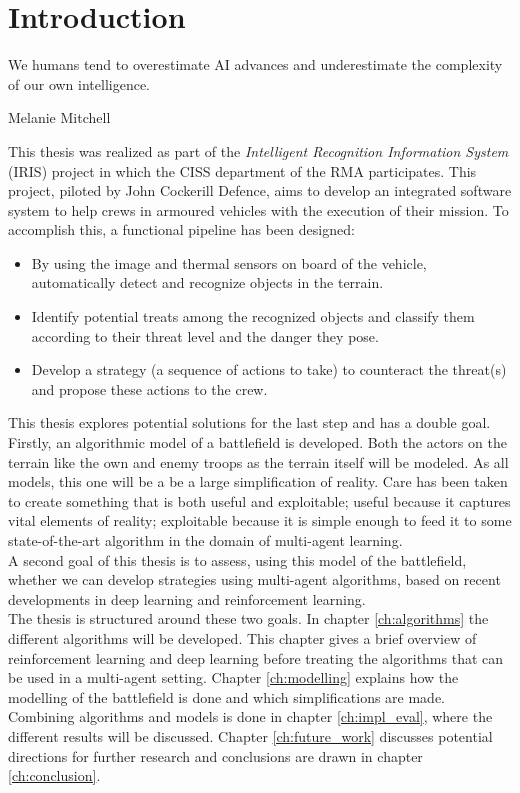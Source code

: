 \chapter{Introduction}

\epigraph{We humans tend to overestimate AI advances and underestimate the complexity of our own intelligence.} {Melanie Mitchell}
This thesis was realized as part of the \emph{Intelligent Recognition Information System} (IRIS) project in which the CISS department of the RMA participates. This project, piloted by John Cockerill Defence, aims to develop an integrated software system to help crews in armoured vehicles with the execution of their mission. To accomplish this, a functional pipeline has been designed:
\begin{itemize}
    \item By using the image and thermal sensors on board of the vehicle, automatically detect and recognize objects in the terrain.
    \item Identify potential treats among the recognized objects and classify them according to their threat level and the danger they pose.
    \item Develop a strategy (a sequence of actions to take) to counteract the threat(s) and propose these actions to the crew.
\end{itemize}
This thesis explores potential solutions for the last step and has a double goal.\\
Firstly, an algorithmic model of a battlefield is developed. Both the actors on the terrain like the own and enemy troops as the terrain itself will be modeled. As all models, this one will be a be a large simplification of reality. Care has been taken to create something that is both useful and exploitable; useful because it captures vital elements of reality; exploitable because it is simple enough to feed it to some state-of-the-art algorithm in the domain of multi-agent learning.\\
A second goal of this thesis is to assess, using this model of the battlefield, whether we can develop strategies using multi-agent algorithms, based on recent developments in deep learning and reinforcement learning.\\
The thesis is structured around these two goals. In chapter \ref{ch:algorithms} the different algorithms will be developed. This chapter gives a brief overview of reinforcement learning and deep learning before treating the algorithms that can be used in a multi-agent setting. Chapter \ref{ch:modelling} explains how the modelling of the battlefield is done and which simplifications are made. Combining algorithms and models is done in chapter \ref{ch:impl_eval}, where the different results will be discussed. Chapter \ref{ch:future_work} discusses potential directions for further research and conclusions are drawn in chapter \ref{ch:conclusion}.

